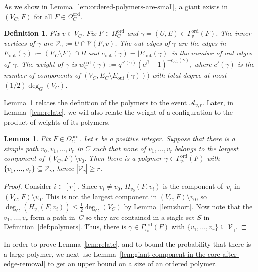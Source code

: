 \documentclass[11pt]{article}
\theoremstyle{plain}
\newtheorem{lemma}[theorem]{Lemma}
\newtheorem{definition}[theorem]{Definition}
\newcommand{\A}{\mathcal{A}}
\newcommand{\emm}{\mathrm{e}}
\newcommand{\V}{\mathcal{V}}
\newcommand{\Vin}{\V_\gamma}
\newcommand{\out}{\mathrm{out}}
\newcommand{\1}{\mathbb{1}}
\newcommand{\ord}{\mathrm{ord}}
\begin{document}
As we show in Lemma~\ref{lem:ordered-polymers-are-small}, a giant exists in \((V_C,F)\) for all \(F\in\Omega_C^\ord\).
 
\begin{definition}\label{def:45f43w}
    Fix \(v\in V_C\).  Fix \(F\in\Omega^\ord_C\) and \(\gamma = (U, B)\in\Gamma^\ord_v(F)\).
The \emph{inner vertices} of \(\gamma\) are \(\Vin := U\cap \V(F,v)\). The \emph{out-edges} of \(\gamma\) are the edges in \(E_\out(\gamma) := (E_C\setminus F)\cap B\) and \(e_\out(\gamma) = |E_\out(\gamma)|\) is the number of out-edges of~$\gamma$.
    The weight of \(\gamma\) is \(w^\ord_C(\gamma) := q^{c'(\gamma)} (\emm^\beta - 1)^{-e_\out(\gamma)}\), where \(c'(\gamma)\) is the number of  components of \((V_C, E_C\setminus E_\out(\gamma)))\) with total degree at most $(1/2) \deg_G(V_C)$.
\end{definition}



Lemma~\ref{lem:path-large-polymer}
relates the definition of the polymers to the event \(\A_{v,r}\).
Later, in Lemma~\ref{lem:relate}, we will also relate
the weight of a configuration to the product of weights of its polymers.

\begin{lemma}\label{lem:path-large-polymer}
Fix \(F\in\Omega^\ord_C\).
Let $r$ be a positive integer.  Suppose that there is a simple path \(v_0,v_1,\dots,v_r\) in \(C\) such that \emph{none} of \(v_1,\dots, v_r\) belongs to the largest component of \((V_C,F)\setminus v_0\). Then there is a polymer \(\gamma\in\Gamma_{v_0}^\ord(F)\) with 
\(\{v_1,\dots,v_r\}\subseteq\Vin\),
hence $|\Vin| \geq r$.
\end{lemma}
\begin{proof}
Consider $i\in [r]$.
Since $v_i \neq v_0$, 
$H_{v_0}(F,v_i)$ is the component of~$v_i$ in $(V_C, F) \setminus v_0$.
This is not the largest component in $(V_C,F)\setminus v_0$, so
$\deg_G(H_{v_0}(F,v_i)) \leq \tfrac12 \deg_G(V_C)$ by Lemma~\ref{lem:short}.
Now note that the $v_1,\ldots,v_r$ form a path in~$C$ so they are contained in a single set $S$ in Definition~\ref{def:polymers}. Thus,
    there is \(\gamma\in\Gamma_{v_0}^\ord(F)\) with \(\{v_1,\dots,v_r\}\subseteq\Vin\).
\end{proof}



In order to prove Lemma~\ref{lem:relate}, and to
bound the probability that there is a large polymer, we next  use Lemma~\ref{lem:giant-component-in-the-core-after-edge-removal} to get an upper bound on a size of an ordered polymer.  
\end{document}
